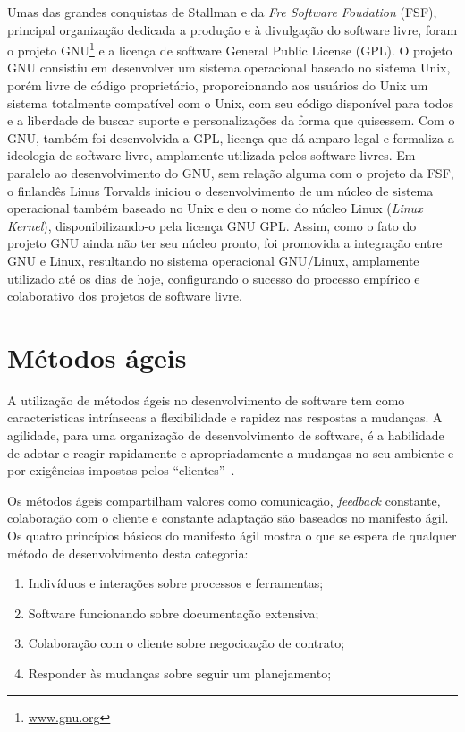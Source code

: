 Umas das grandes conquistas de Stallman e da \emph{Fre Software Foudation} (FSF), 
principal organização dedicada a produção e à divulgação do software livre, 
foram o projeto GNU\footnote{\url{www.gnu.org}} e a licença de software General Public License (GPL).
%
O projeto GNU consistiu em desenvolver um sistema operacional baseado no sistema 
Unix, porém livre de código proprietário, proporcionando aos usuários do Unix um 
sistema totalmente compatível com o Unix, com seu código disponível para todos e 
a liberdade de buscar suporte e personalizações da forma que quisessem.
%
Com o GNU, também foi desenvolvida a GPL, licença que dá amparo legal e formaliza 
a ideologia de software livre, amplamente utilizada pelos software livres.
%
Em paralelo ao desenvolvimento do GNU, sem relação alguma com o projeto da FSF,
o finlandês Linus Torvalds iniciou o desenvolvimento de um núcleo de sistema operacional também baseado no Unix e deu o nome do núcleo Linux (\emph{Linux Kernel}), disponibilizando-o pela licença GNU GPL.
%
Assim, como o fato do projeto GNU ainda não ter seu núcleo pronto, foi promovida a integração entre GNU e Linux, resultando no sistema operacional GNU/Linux, amplamente utilizado até os dias de hoje, configurando o sucesso do processo empírico e colaborativo dos projetos de software livre.


\section{Métodos ágeis}
\label{metodos-ageis}

A utilização de métodos ágeis no desenvolvimento de software tem como caracteristicas 
intrínsecas a flexibilidade e rapidez nas respostas a mudanças. 
%
A agilidade, para uma organização de desenvolvimento de software, é a habilidade 
de adotar e reagir rapidamente e apropriadamente a mudanças no seu ambiente e por 
exigências impostas pelos ``clientes''~\cite{nerur2005}.
 	
Os métodos ágeis compartilham valores como comunicação, \emph{feedback} constante, colaboração com o cliente e constante adaptação são baseados no manifesto ágil. Os quatro princípios básicos do manifesto ágil mostra o que se espera de qualquer método de desenvolvimento desta categoria:
%
\begin{enumerate}
\item Indivíduos  e interações sobre processos e ferramentas;
\item Software funcionando sobre documentação extensiva;
\item Colaboração com o cliente sobre negocioação de contrato;
\item Responder às  mudanças sobre seguir um planejamento;
\end{enumerate}


